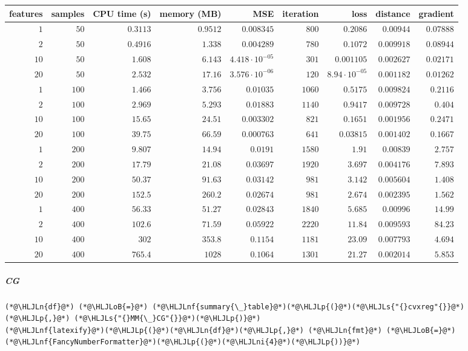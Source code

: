 \documentclass[12pt,a4paper]{article}
\newcommand{\HLJLn}[1]{#1}
\newcommand{\HLJLnf}[1]{\textcolor[RGB]{66,102,213}{#1}}
\newcommand{\HLJLs}[1]{\textcolor[RGB]{201,61,57}{#1}}
\newcommand{\HLJLni}[1]{\textcolor[RGB]{59,151,46}{#1}}
\newcommand{\HLJLoB}[1]{\textcolor[RGB]{102,102,102}{\textbf{#1}}}
\newcommand{\HLJLp}[1]{#1}
\begin{document}
\begin{tabular}
{r | r | r | r | r | r | r | r | r}
features & samples & CPU time (s) & memory (MB) & MSE & iteration & loss & distance & gradient \\
\hline
$1$ & $50$ & $0.3113$ & $0.9512$ & $0.008345$ & $800$ & $0.2086$ & $0.00944$ & $0.07888$ \\
$2$ & $50$ & $0.4916$ & $1.338$ & $0.004289$ & $780$ & $0.1072$ & $0.009918$ & $0.08944$ \\
$10$ & $50$ & $1.608$ & $6.143$ & $4.418 \cdot 10^{-05}$ & $301$ & $0.001105$ & $0.002627$ & $0.02171$ \\
$20$ & $50$ & $2.532$ & $17.16$ & $3.576 \cdot 10^{-06}$ & $120$ & $8.94 \cdot 10^{-05}$ & $0.001182$ & $0.01262$ \\
$1$ & $100$ & $1.466$ & $3.756$ & $0.01035$ & $1060$ & $0.5175$ & $0.009824$ & $0.2116$ \\
$2$ & $100$ & $2.969$ & $5.293$ & $0.01883$ & $1140$ & $0.9417$ & $0.009728$ & $0.404$ \\
$10$ & $100$ & $15.65$ & $24.51$ & $0.003302$ & $821$ & $0.1651$ & $0.001956$ & $0.2471$ \\
$20$ & $100$ & $39.75$ & $66.59$ & $0.000763$ & $641$ & $0.03815$ & $0.001402$ & $0.1667$ \\
$1$ & $200$ & $9.807$ & $14.94$ & $0.0191$ & $1580$ & $1.91$ & $0.00839$ & $2.757$ \\
$2$ & $200$ & $17.79$ & $21.08$ & $0.03697$ & $1920$ & $3.697$ & $0.004176$ & $7.893$ \\
$10$ & $200$ & $50.37$ & $91.63$ & $0.03142$ & $981$ & $3.142$ & $0.005604$ & $1.408$ \\
$20$ & $200$ & $152.5$ & $260.2$ & $0.02674$ & $981$ & $2.674$ & $0.002395$ & $1.562$ \\
$1$ & $400$ & $56.33$ & $51.27$ & $0.02843$ & $1840$ & $5.685$ & $0.00996$ & $14.99$ \\
$2$ & $400$ & $102.6$ & $71.59$ & $0.05922$ & $2220$ & $11.84$ & $0.009593$ & $84.23$ \\
$10$ & $400$ & $302$ & $353.8$ & $0.1154$ & $1181$ & $23.09$ & $0.007793$ & $4.694$ \\
$20$ & $400$ & $765.4$ & $1028$ & $0.1064$ & $1301$ & $21.27$ & $0.002014$ & $5.853$ \\
\end{tabular}


\subparagraph{CG}

\begin{lstlisting}
(*@\HLJLn{df}@*) (*@\HLJLoB{=}@*) (*@\HLJLnf{summary{\_}table}@*)(*@\HLJLp{(}@*)(*@\HLJLs{"{}cvxreg"{}}@*)(*@\HLJLp{,}@*) (*@\HLJLs{"{}MM{\_}CG"{}}@*)(*@\HLJLp{)}@*)
(*@\HLJLnf{latexify}@*)(*@\HLJLp{(}@*)(*@\HLJLn{df}@*)(*@\HLJLp{,}@*) (*@\HLJLn{fmt}@*) (*@\HLJLoB{=}@*) (*@\HLJLnf{FancyNumberFormatter}@*)(*@\HLJLp{(}@*)(*@\HLJLni{4}@*)(*@\HLJLp{))}@*)
\end{lstlisting}
\end{document}
